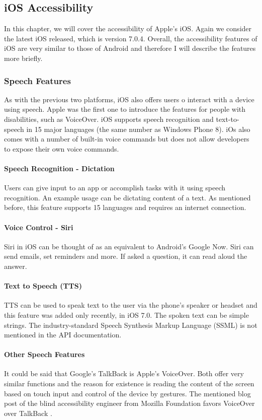 \subsection{iOS Accessibility}
In this chapter, we will cover the accessibility of Apple's iOS. Again we consider the latest iOS released, which is version 7.0.4. Overall, the accessibility features of iOS are very similar to those of Android and therefore I will describe the features more briefly.
\subsubsection{Speech Features}
As with the previous two platforms, iOS also offers users o interact with a device using speech. Apple was the first one to introduce the features for people with disabilities, such as VoiceOver. iOS supports speech recognition and text-to-speech in 15 major languages (the same number as Windows Phone 8).
iOs also comes with a number of built-in voice commands but does not allow developers to expose their own voice commands.
\paragraph{Speech Recognition - Dictation}
Users can give input to an app or accomplish tasks with it using speech recognition. An example usage can be dictating content of a text. As mentioned before, this feature supports 15 languages and requires an internet connection.
\paragraph{Voice Control - Siri}
Siri in iOS can be thought of as an equivalent to Android's Google Now. Siri can send emails, set reminders and more. If asked a question, it can read aloud the answer. 
\paragraph{Text to Speech (TTS)}
TTS can be used to speak text to the user via the phone's speaker or headset and this feature was added only recently, in iOS 7.0. The spoken text can be simple strings. The industry-standard Speech Synthesis Markup Language (SSML) is not mentioned in the API documentation.
\paragraph{Other Speech Features}
It could be said that Google's TalkBack is Apple's VoiceOver. Both offer very similar functions and the reason for existence is reading the content of the screen based on touch input and control of the device by gestures.
The mentioned blog post of the blind accessibility engineer from Mozilla Foundation favors VoiceOver over TalkBack \cite{mozillaguy}.

